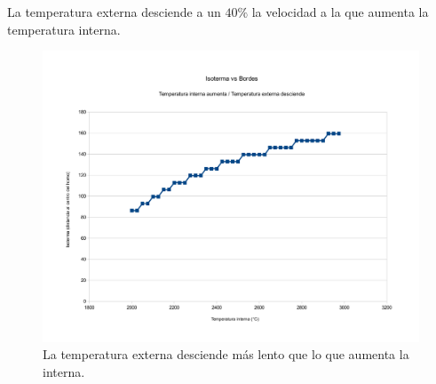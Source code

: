 La temperatura externa desciende a un $40\%$ la velocidad a la que aumenta la temperatura interna.

\begin{figure}[H]{}
\centering
\includegraphics[scale=0.5]{graphs/isotermaVsBordesExternaDesciende.pdf}
\caption{La temperatura externa desciende más lento que lo que aumenta la interna.}
\label{isotermaVsBordesExternaDesciende}
\end{figure}